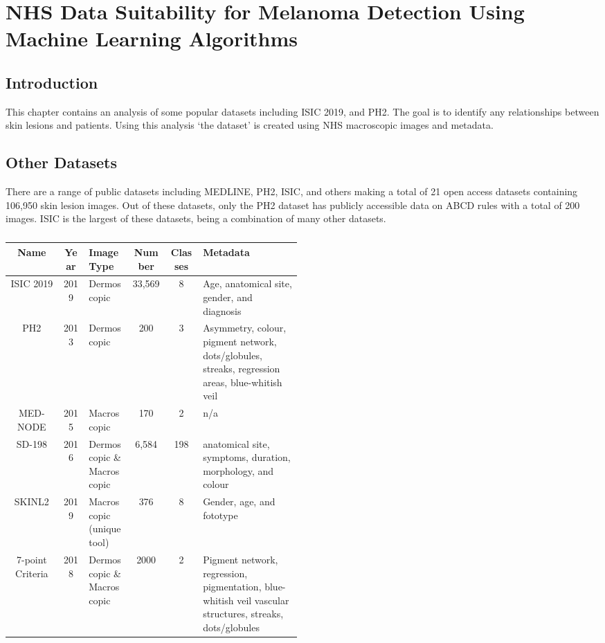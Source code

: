 \chapter{NHS Data Suitability for Melanoma Detection Using Machine Learning Algorithms}

\section{Introduction}
This chapter contains an analysis of some popular datasets including ISIC 2019, and PH2. The goal is to identify any relationships between skin lesions and patients. Using this analysis `the dataset' is created using NHS macroscopic images and metadata.

\section{Other Datasets}
There are a range of public datasets including MEDLINE, PH2, ISIC, and others making a total of 21 open access datasets containing 106,950 skin lesion images\cite{Wen2022}. Out of these datasets, only the PH2 dataset has publicly accessible data on ABCD rules with a total of 200 images. ISIC is the largest of these datasets, being a combination of many other datasets.

\begin{table}
	\small
	\begin{tabular}{|c|c|p{0.15\linewidth}|c|c|p{0.34\linewidth}|}
		\hline
		Name & Year & Image Type & Number & Classes & Metadata \\
		\hline
		ISIC 2019 & 2019 & Dermoscopic & 33,569 & 8 & Age, anatomical site, gender, and diagnosis
		\\
		\hline
		PH2 & 2013 & Dermoscopic & 200 & 3 & Asymmetry, colour, pigment network, dots/globules, streaks, regression areas, blue-whitish veil
		\\
		\hline
		MED-NODE  & 2015 & Macroscopic & 170 & 2 & n/a
		\\
		\hline	
		SD-198  & 2016 & Dermoscopic \& Macroscopic & 6,584 & 198 & anatomical site, symptoms, duration, morphology, and colour
		\\
		\hline	
		SKINL2 & 2019 & Macroscopic (unique tool) & 376 & 8 & Gender, age, and fototype
		\\
		\hline
		7-point Criteria & 2018 & Dermoscopic \& Macroscopic & 2000 & 2 & Pigment network, regression, pigmentation, blue-whitish veil vascular structures, streaks, dots/globules
		\\
		\hline	
	\end{tabular}
	\caption{}
	\end{table} \label{datasets}

